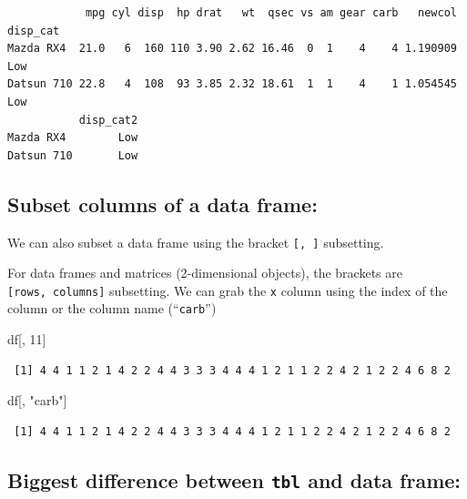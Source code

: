 \documentclass[
]{article}
\newenvironment{Shaded}{\begin{snugshade}}{\end{snugshade}}
\newcommand{\DecValTok}[1]{\textcolor[rgb]{0.00,0.00,0.81}{#1}}
\newcommand{\NormalTok}[1]{#1}
\newcommand{\StringTok}[1]{\textcolor[rgb]{0.31,0.60,0.02}{#1}}
\begin{document}
\begin{verbatim}
            mpg cyl disp  hp drat   wt  qsec vs am gear carb   newcol disp_cat
Mazda RX4  21.0   6  160 110 3.90 2.62 16.46  0  1    4    4 1.190909      Low
Datsun 710 22.8   4  108  93 3.85 2.32 18.61  1  1    4    1 1.054545      Low
           disp_cat2
Mazda RX4        Low
Datsun 710       Low
\end{verbatim}

\hypertarget{subset-columns-of-a-data-frame-1}{%
\subsection{Subset columns of a data
frame:}\label{subset-columns-of-a-data-frame-1}}

We can also subset a data frame using the bracket \texttt{{[},\ {]}}
subsetting.

For data frames and matrices (2-dimensional objects), the brackets are
\texttt{{[}rows,\ columns{]}} subsetting. We can grab the \texttt{x}
column using the index of the column or the column name
(``\texttt{carb}'')

\begin{Shaded}
\begin{Highlighting}[]
\NormalTok{df[, }\DecValTok{11}\NormalTok{]}
\end{Highlighting}
\end{Shaded}

\begin{verbatim}
 [1] 4 4 1 1 2 1 4 2 2 4 4 3 3 3 4 4 4 1 2 1 1 2 2 4 2 1 2 2 4 6 8 2
\end{verbatim}

\begin{Shaded}
\begin{Highlighting}[]
\NormalTok{df[, }\StringTok{"carb"}\NormalTok{]}
\end{Highlighting}
\end{Shaded}

\begin{verbatim}
 [1] 4 4 1 1 2 1 4 2 2 4 4 3 3 3 4 4 4 1 2 1 1 2 2 4 2 1 2 2 4 6 8 2
\end{verbatim}

\hypertarget{biggest-difference-between-tbl-and-data-frame}{%
\subsection{\texorpdfstring{Biggest difference between \texttt{tbl} and
data
frame:}{Biggest difference between tbl and data frame:}}\label{biggest-difference-between-tbl-and-data-frame}}
\end{document}
